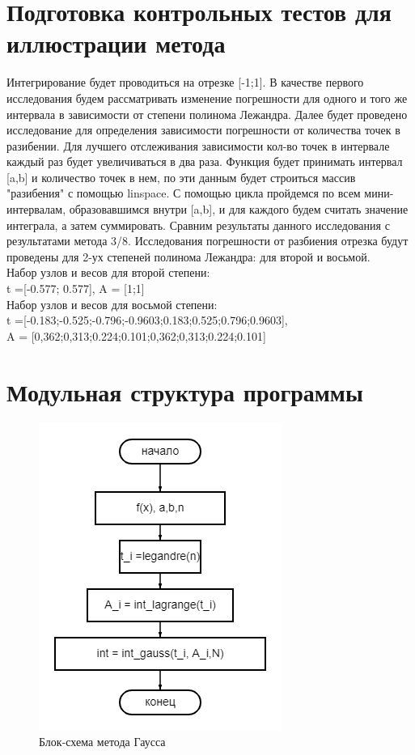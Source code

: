 \documentclass[a4paper]{article}
\begin{document}
 
\section{Подготовка контрольных тестов для иллюстрации метода} 

Интегрирование будет проводиться на отрезке [-1;1]. В качестве первого исследования будем рассматривать изменение погрешности для одного и того же интервала в зависимости от степени полинома Лежандра. Далее будет проведено исследование для определения зависимости погрешности от количества точек в разибении. Для лучшего отслеживания зависимости кол-во точек в интервале каждый раз будет увеличиваться в два раза. Функция будет принимать интервал [a,b] и количество точек в нем, по эти данным будет строиться массив "разибения" с помощью linspace. С помощью цикла пройдемся по всем мини-интервалам, образовавшимся внутри [a,b], и для каждого будем считать значение интеграла, а затем суммировать. Сравним результаты данного исследования с результатами метода 3/8. Исследования погрешности от разбиения отрезка будут проведены для 2-ух степеней полинома Лежандра: для второй и восьмой.\\
Набор узлов и весов для второй степени:\\ t  =[-0.577; 0.577], A = [1;1]\\
Набор узлов и весов для восьмой степени: \\t  =[-0.183;-0.525;-0.796;-0.9603;0.183;0.525;0.796;0.9603],\\ A = [0,362;0,313;0.224;0.101;0,362;0,313;0.224;0.101]
  
\newpage
\section{Модульная структура программы} 
 
\begin{figure}[h!]
\begin{center}
\includegraphics[scale=0.7]{diagram (6).png} 
\end{center}
\caption{Блок-схема метода Гаусса} \label{Рис1}
\end{figure}
\end{document}
